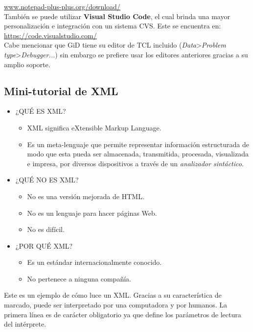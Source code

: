 \documentclass[10pt, a4paper, twocolumn]{article} %
\begin{document}
\textcolor{BlueGiD}{\underline{\url{www.notepad-plus-plus.org/download/}}}\\

También se puede utilizar \textbf{Visual Studio Code}, el cual brinda una mayor personalización e integración con un sistema CVS. Este se encuentra en:\\

\textcolor{BlueGiD}{\underline{\url{https://code.visualstudio.com/}}}\\

Cabe mencionar que GiD tiene su editor de TCL incluido (\textit{Data}>\textit{Problem type}>\textit{Debugger...}) sin embargo se prefiere usar los editores anteriores gracias a su amplio soporte.

\subsection{Mini-tutorial de XML}

\begin{itemize}
	\item ¿QUÉ ES XML?
		\begin{itemize}
			\item XML significa eXtensible Markup Language.
			\item Es un meta-lenguaje que permite representar información estructurada de modo que esta pueda ser almacenada, transmitida, procesada, visualizada e impresa, por diversos dispositivos a través de un \textit{analizador sintáctico}.
		\end{itemize}
	\item ¿QUÉ NO ES XML?
		\begin{itemize}
			\item No es una versión mejorada de HTML.
			\item No es un lenguaje para hacer páginas Web.
			\item No es difícil.
		\end{itemize}
	\item ¿POR QUÉ XML?
		\begin{itemize}
			\item Es un estándar internacionalmente conocido.
			\item No pertenece a ninguna compañía.
		\end{itemize}
\end{itemize}

Este es un ejemplo de cómo luce un XML. Gracias a su característica de marcado, puede ser interpretado por una computadora y por humanos. La primera línea es de carácter obligatorio ya que define los parámetros de lectura del intérprete.
\end{document}
